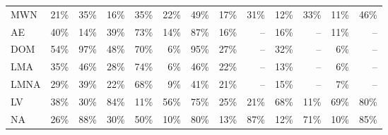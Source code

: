 \begin{figure*}[t]
{\begin{tabular}{lrrrrrr|rrrrrr}
\multicolumn{1}{l}{MWN} & \cellcolor{lightblack}21\%  & \cellcolor{lightblack}35\%  & \cellcolor{lightblack}16\%  & \cellcolor{lightblack}35\%  & \cellcolor{lightblack}22\%  & \cellcolor{lightblack}49\%  & \cellcolor{lightblack}17\%  & \cellcolor{lightblack}31\%  & \cellcolor{lightblack}12\%  & \cellcolor{lightblack}33\%  & \cellcolor{lightblack}11\%  & \cellcolor{lightblack}46\% \\
\multicolumn{1}{l}{AE} & \cellcolor{lightblack}40\%  &  \cellcolor{lightblack}14\%   & \cellcolor{lightblack}39\%  & \cellcolor{lightgreen}73\%  &  \cellcolor{lightblack}14\%   & \cellcolor{lightgreen}87\%  & \cellcolor{lightblack}16\%  &  --   & \cellcolor{lightblack}16\%  & --  &  \cellcolor{lightblack}11\%   & -- \\
\multicolumn{1}{l}{DOM} & \cellcolor{lightblack}54\%  & \cellcolor{lightgreen}97\%  & \cellcolor{lightblack}48\%  & \cellcolor{lightgreen}70\%  &  \cellcolor{lightblue}6\%   & \cellcolor{lightgreen}95\%  & \cellcolor{lightblack}27\%  & --  & \cellcolor{lightblack}32\%  & --  &  \cellcolor{lightblue}6\%   & -- \\
\multicolumn{1}{l}{LMA} & \cellcolor{lightblack}35\%  & \cellcolor{lightblack}46\%  & \cellcolor{lightblack}28\%  & \cellcolor{lightgreen}74\%  &  \cellcolor{lightblue}6\%   & \cellcolor{lightblack}46\%  & \cellcolor{lightblack}22\%  & --  & \cellcolor{lightblack}13\%  & --  &  \cellcolor{lightblue}6\%   & -- \\
\multicolumn{1}{l}{LMNA} & \cellcolor{lightblack}29\%  & \cellcolor{lightblack}39\%  & \cellcolor{lightblack}22\%  & \cellcolor{lightgreen}68\%  &  \cellcolor{lightblue}9\%   & \cellcolor{lightblack}41\%  & \cellcolor{lightblack}21\%  & --  & \cellcolor{lightblack}15\%  & --  &  \cellcolor{lightblue}7\%   & -- \\
\multicolumn{1}{l}{LV} & \cellcolor{lightblack}38\%  & \cellcolor{lightblack}30\%  & \cellcolor{lightgreen}84\%  &  \cellcolor{lightblack}11\%   & \cellcolor{lightblack}56\%  & \cellcolor{lightgreen}75\%  & \cellcolor{lightblack}25\%  & \cellcolor{lightblack}21\%  & \cellcolor{lightgreen}68\%  &  \cellcolor{lightblack}11\%   & \cellcolor{lightblack}69\%  & \cellcolor{lightgreen}80\% \\
\multicolumn{1}{l}{NA} & \cellcolor{lightblack}26\%  & \cellcolor{lightgreen}88\%  & \cellcolor{lightblack}30\%  & \cellcolor{lightblack}50\%  &  \cellcolor{lightblue}10\%   & \cellcolor{lightgreen}80\%  & \cellcolor{lightblack}13\%  & \cellcolor{lightgreen}87\%  & \cellcolor{lightblack}12\%  & \cellcolor{lightgreen}71\%  &  \cellcolor{lightblue}10\%   & \cellcolor{lightgreen}85\% \\

\end{tabular}}
\end{figure*}
